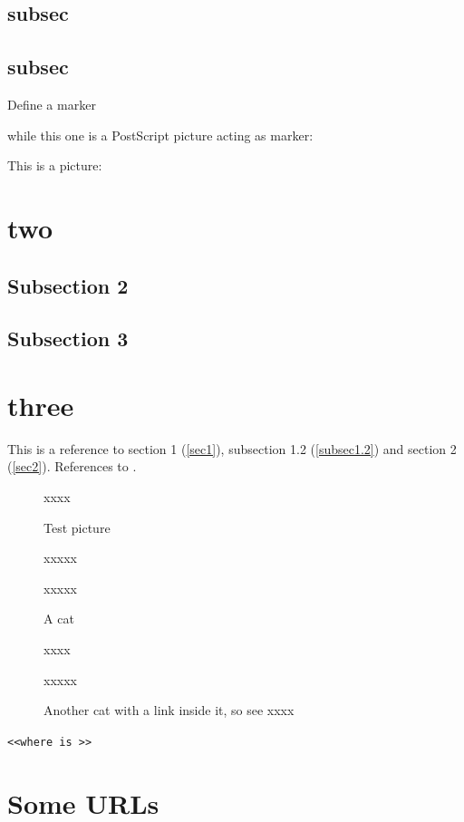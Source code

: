 \documentclass[11pt]{book}
\begin{document}
\subsection{subsec}
\newpage
\subsection{subsec}\label{subsec1.2}
Define a marker  while this one is a
PostScript picture acting as marker:
\hyperlink{testpiccy}{}

This is a picture: 
\newpage
\section{two}\label{sec2}
\subsection{Subsection 2}
\subsection{Subsection 3}
\newpage
\section{three}
This is a reference to section 1 (\autoref{sec1}), subsection 1.2
(\autoref{subsec1.2}) and section 2 (\autoref{sec2}). References to
\cite{Barcelo:1992:caa,Dallas:aia}.


\begin{figure}

xxxx

\hypertarget{testpiccy}{Test picture}

xxxxx

xxxxx
\caption{{A cat}}
\label{fig1}
\end{figure}

\begin{figure}

xxxx

xxxxx
\caption{Another cat with a link inside it,
so see  \cite{Dallas:aia} xxxx \label{fig2}}
\end{figure}

\texttt{<<where is >>}

\section{Some URLs}
\end{document}
